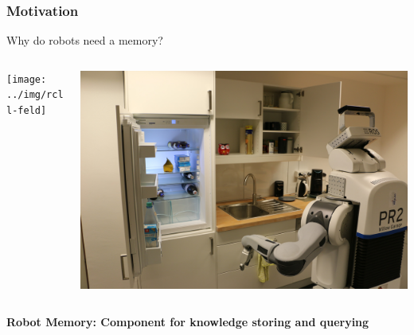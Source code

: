 \begin{frame}
  \frametitle{Motivation}
  \Large{Why do robots need a memory?}
  \vspace{1cm}
  \begin{columns}
    \begin{column}{0.5\textwidth}
    \texttt{[image: ../img/rcll-feld]}
    \end{column}
    \begin{column}{0.5\textwidth}
    \includegraphics[width=\textwidth]{../img/pr2-kbsg-kitchen}
    \end{column}
  \end{columns}
\pause
  \begin{block}{} \centering\bfseries Robot Memory: Component for knowledge storing and querying 
  \end{block}
\end{frame}

